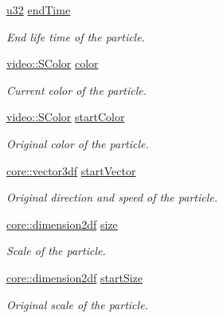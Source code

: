 \begin{DoxyCompactItemize}
\mbox{\label{structirr_1_1scene_1_1SParticle_ade0deb0f5ed021cb6aa4df9f906d4b36}} 
\hyperlink{namespaceirr_a0416a53257075833e7002efd0a18e804}{u32} \hyperlink{structirr_1_1scene_1_1SParticle_ade0deb0f5ed021cb6aa4df9f906d4b36}{end\+Time}
\begin{DoxyCompactList}\small\item\em End life time of the particle. \end{DoxyCompactList}\item 
\mbox{\label{structirr_1_1scene_1_1SParticle_a62816a5bae441b16f9bd50dfba14abc0}} 
\hyperlink{classirr_1_1video_1_1SColor}{video\+::\+S\+Color} \hyperlink{structirr_1_1scene_1_1SParticle_a62816a5bae441b16f9bd50dfba14abc0}{color}
\begin{DoxyCompactList}\small\item\em Current color of the particle. \end{DoxyCompactList}\item 
\hyperlink{classirr_1_1video_1_1SColor}{video\+::\+S\+Color} \hyperlink{structirr_1_1scene_1_1SParticle_a23325221f845c68dd331edb38d90374f}{start\+Color}
\begin{DoxyCompactList}\small\item\em Original color of the particle. \end{DoxyCompactList}\item 
\hyperlink{namespaceirr_1_1core_ae6e2b2a6c552833ebbd5b7463d03586b}{core\+::vector3df} \hyperlink{structirr_1_1scene_1_1SParticle_a5e8b1dcb8825e467b6ed2d4f48c321e2}{start\+Vector}
\begin{DoxyCompactList}\small\item\em Original direction and speed of the particle. \end{DoxyCompactList}\item 
\hyperlink{namespaceirr_1_1core_a54f0e5b7416e6dce5a0f6213f00a580f}{core\+::dimension2df} \hyperlink{structirr_1_1scene_1_1SParticle_a548dc843e9db5db26e0005a2cb29a609}{size}
\begin{DoxyCompactList}\small\item\em Scale of the particle. \end{DoxyCompactList}\item 
\hyperlink{namespaceirr_1_1core_a54f0e5b7416e6dce5a0f6213f00a580f}{core\+::dimension2df} \hyperlink{structirr_1_1scene_1_1SParticle_a753df7de54e742cd7d50ff10154906ee}{start\+Size}
\begin{DoxyCompactList}\small\item\em Original scale of the particle. \end{DoxyCompactList}\end{DoxyCompactItemize}


